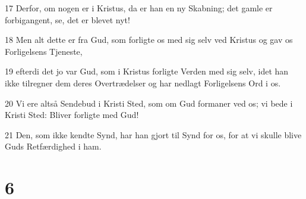 \par 17 Derfor, om nogen er i Kristus, da er han en ny Skabning; det gamle er forbigangent, se, det er blevet nyt!
\par 18 Men alt dette er fra Gud, som forligte os med sig selv ved Kristus og gav os Forligelsens Tjeneste,
\par 19 efterdi det jo var Gud, som i Kristus forligte Verden med sig selv, idet han ikke tilregner dem deres Overtrædelser og har nedlagt Forligelsens Ord i os.
\par 20 Vi ere altså Sendebud i Kristi Sted, som om Gud formaner ved os; vi bede i Kristi Sted: Bliver forligte med Gud!
\par 21 Den, som ikke kendte Synd, har han gjort til Synd for os, for at vi skulle blive Guds Retfærdighed i ham.

\chapter{6}

